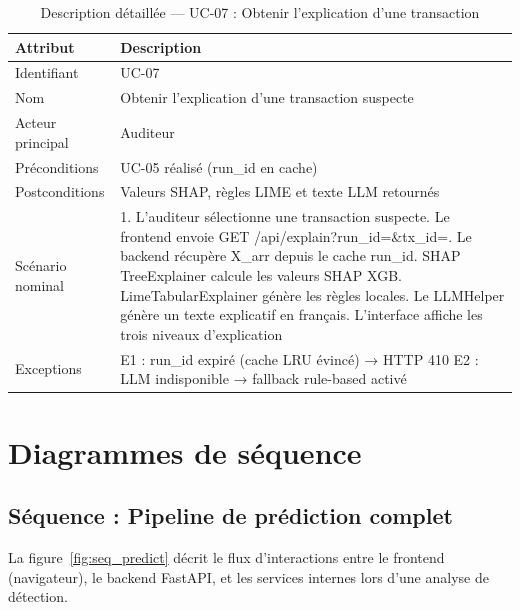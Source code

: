 \documentclass[12pt,a4paper,twoside]{report}
\theoremstyle{definition}
\begin{document}
\begin{table}[H]
\centering
\caption{Description détaillée — UC-07 : Obtenir l'explication d'une transaction}
\label{tab:uc07}
\renewcommand{\arraystretch}{1.3}
\begin{tabular}{L{3.5cm}L{9.5cm}}
\toprule
\textbf{Attribut} & \textbf{Description} \\
\midrule
Identifiant & UC-07 \\
Nom & Obtenir l'explication d'une transaction suspecte \\
Acteur principal & Auditeur \\
Préconditions & UC-05 réalisé (run\_id en cache) \\
Postconditions & Valeurs SHAP, règles LIME et texte LLM retournés \\
Scénario nominal &
1. L'auditeur sélectionne une transaction suspecte. Le frontend envoie GET /api/explain?run\_id=\&tx\_id=. Le backend récupère X\_arr depuis le cache run\_id. SHAP TreeExplainer calcule les valeurs SHAP XGB. LimeTabularExplainer génère les règles locales. Le LLMHelper génère un texte explicatif en français. L'interface affiche les trois niveaux d'explication \\
Exceptions &
E1 : run\_id expiré (cache LRU évincé) → HTTP 410\newline
E2 : LLM indisponible → fallback rule-based activé \\
\bottomrule
\end{tabular}
\end{table}

\section{Diagrammes de séquence}

\subsection{Séquence : Pipeline de prédiction complet}


La figure~\ref{fig:seq_predict} décrit le flux d'interactions entre le frontend
(navigateur), le backend FastAPI, et les services internes lors d'une analyse
de détection.
\end{document}

